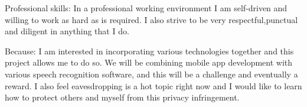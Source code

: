 \inlineheadsection
  {Professional skills:}
  {In a professional working environment I am self-driven and willing to work as hard as is required. I also strive to be very respectful,punctual and diligent in anything that I do.}
  
\spacedhrule{1.6em}{-0.4em}  
  

\inlineheadsection
  {Because:}
  {I am interested in incorporating various technologies together and this project allows me to do so. We will be combining mobile app development with various speech recognition software, and this will be a challenge and eventually a reward. I also feel eavesdropping is a hot topic right now and I would like to learn how to protect others and myself from this privacy infringement.}